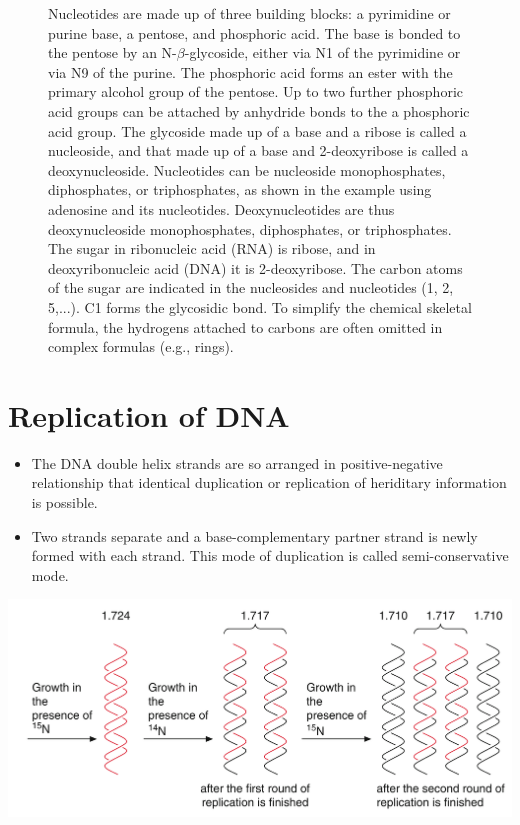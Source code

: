 \documentclass[11pt,ignorenonframetext,aspectratio=169]{beamer}
\providecommand{\tightlist}{%
  \setlength{\itemsep}{0pt}\setlength{\parskip}{0pt}}
\begin{document}
\begin{frame}{}
\begin{figure}
\begin{columns}[T,onlytextwidth]
  \caption{\newline Nucleotides are made up of three building blocks: a pyrimidine or purine base, a pentose, and phosphoric acid. The base is bonded to the pentose by an N-$\beta$-glycoside, either via N1 of the pyrimidine or via N9 of the purine. The phosphoric acid forms an ester with the primary alcohol group of the pentose. Up to two further phosphoric acid groups can be attached by anhydride bonds to the a phosphoric acid group. The glycoside made up of a base and a ribose is called a nucleoside, and that made up of a base and 2-deoxyribose is called a deoxynucleoside. Nucleotides can be nucleoside monophosphates, diphosphates, or triphosphates, as shown in the example using adenosine and its nucleotides. Deoxynucleotides are thus deoxynucleoside monophosphates, diphosphates, or triphosphates. The sugar in ribonucleic acid (RNA) is ribose, and in deoxyribonucleic acid (DNA) it is 2-deoxyribose. The carbon atoms of the sugar are indicated in the nucleosides and nucleotides (1, 2, 5,...). C1 forms the glycosidic bond. To simplify the chemical skeletal formula, the hydrogens attached to carbons are often omitted in complex formulas (e.g., rings).}
  \label{fig:nucleotide-blocks}
  
  \end{columns}
\end{figure}
\end{frame}

\hypertarget{replication-of-dna}{%
\section{Replication of DNA}\label{replication-of-dna}}

\begin{frame}{}
\protect\hypertarget{section-7}{}
\begin{itemize}
\tightlist
\item
  The DNA double helix strands are so arranged in positive-negative
  relationship that identical duplication or replication of heriditary
  information is possible.
\item
  Two strands separate and a base-complementary partner strand is newly
  formed with each strand. This mode of duplication is called
  semi-conservative mode.
\end{itemize}

\begin{center}\includegraphics[width=0.56\linewidth]{../images/semi_conservative_replication} \end{center}
\end{frame}
\end{document}
